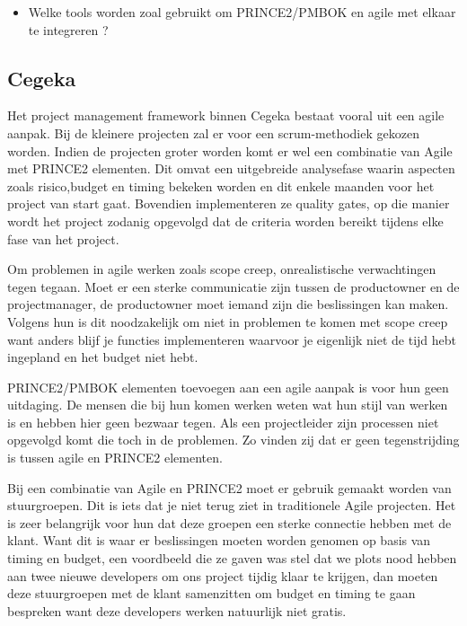 \documentclass[dutch]{hogent-article}
\begin{document}
\begin{itemize}
    \item Welke tools worden zoal gebruikt om PRINCE2/PMBOK en agile met elkaar te integreren ?
     \newline
\end{itemize}

\subsection{Cegeka}
\label{ssec:Inetum-Cegeka}

Het project management framework binnen Cegeka bestaat vooral uit een agile aanpak. \linebreak Bij de kleinere projecten zal er voor een scrum-methodiek gekozen worden.
Indien de projecten \linebreak groter worden komt er wel een combinatie van Agile met PRINCE2 elementen. Dit omvat een uitgebreide analysefase waarin aspecten zoals risico,budget en timing bekeken worden en dit enkele maanden voor het project van start gaat. Bovendien implementeren ze quality gates, op die manier wordt het project zodanig opgevolgd dat de criteria worden bereikt tijdens elke fase van het project.
\newline

Om problemen in agile werken zoals scope creep, onrealistische verwachtingen tegen tegaan. Moet er een sterke communicatie zijn tussen de productowner en de projectmanager, de productowner moet iemand zijn die beslissingen kan maken. Volgens hun is dit noodzakelijk om niet in problemen te komen met scope creep want anders blijf je functies implementeren waarvoor je eigenlijk niet de tijd hebt ingepland en het budget niet hebt. 
\newline

PRINCE2/PMBOK elementen toevoegen aan een agile aanpak is voor hun geen uitdaging. \linebreak De mensen die bij hun komen werken weten wat hun stijl van werken is en hebben hier geen bezwaar tegen.
Als een projectleider zijn processen niet opgevolgd komt die toch in de problemen. Zo vinden zij dat er geen tegenstrijding is tussen agile en PRINCE2 elementen.
\newline

Bij een combinatie van Agile en PRINCE2 moet er gebruik gemaakt worden van stuurgroepen. Dit is iets dat je niet
terug ziet in traditionele Agile projecten. Het is zeer belangrijk voor hun dat deze groepen een sterke connectie hebben met de klant.
Want dit is waar er beslissingen moeten worden genomen op basis van timing en budget, een voordbeeld die ze gaven was stel dat we 
plots nood hebben aan twee nieuwe developers om ons project tijdig klaar te krijgen, dan moeten deze stuurgroepen met
de klant samenzitten om budget en timing te gaan bespreken want deze developers werken natuurlijk niet gratis.
\newline
\end{document}
